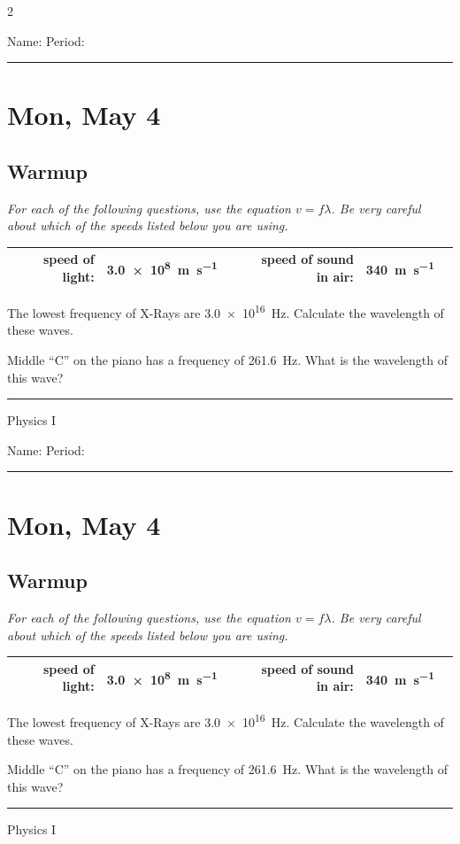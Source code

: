 \documentclass[10pt,landscape]{exam}
\def\todayDate{Mon, May 4}
\def\content{


\emph{For each of the following questions, use the equation $v=f\lambda$.  Be very careful about which of the speeds listed below you are using.}

\begin{center}
  \renewcommand{\arraystretch}{2}
  \begin{tabular}{|crlc|crlc|}
    \hline
     & speed of light: & \SI{3.0e8}{\meter\per\second} & &
     & speed of sound in air: & \SI{340}{\meter\per\second} &
    \\\hline
  \end{tabular}
\end{center}


\begin{questions}

\question
  The lowest frequency of X-Rays are \SI{3.0e16}{Hz}.  Calculate the wavelength of these waves. \vs
  
\question
  Middle ``C'' on the piano has a frequency of \SI{261.6}{Hz}.  What is the wavelength of this wave?

\end{questions}


}
\begin{document}
\pagestyle{empty}

\setlength{\columnsep}{0.8in}
\begin{multicols*}{2}

\noindent  
Name: \hfill Period: \hspace{5em}
\vspace{0.5em}
\hrule

\section*{\todayDate}
\subsection*{Warmup}

\content

\vfill
\hrule
\vspace{0.5em}
\hfill {\sc Physics I}

\columnbreak

\noindent  
Name: \hfill Period: \hspace{5em}
\vspace{0.5em}
\hrule

\section*{\todayDate}
\subsection*{Warmup}

\content

\vfill
\hrule
\vspace{0.5em}
\hfill {\sc Physics I}

\end{multicols*}
\end{document}
